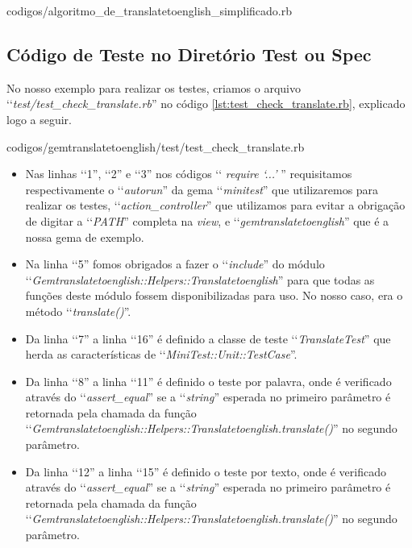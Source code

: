 
{codigos/algoritmo_de_translatetoenglish_simplificado.rb}


\subsection{Código de Teste no Diretório Test ou Spec}
\label{subsection:codigo_de_teste_no_diretorio_test_ou_spec}


No nosso exemplo para realizar os testes, criamos o arquivo ‘‘\emph{test/test\_check\_translate.rb}'' no código
\ref{lst:test_check_translate.rb}, explicado logo a seguir.


{codigos/gemtranslatetoenglish/test/test_check_translate.rb}

\begin{itemize}

 \item Nas linhas ‘‘1'', ‘‘2'' e ‘‘3'' nos códigos ‘‘ \emph{require ‘...'} '' requisitamos respectivamente o
 ‘‘\emph{autorun}'' da gema ‘‘\emph{minitest}'' que utilizaremos para realizar os testes,
 ‘‘\emph{action\_controller}'' que utilizamos para evitar a obrigação de digitar a ‘‘\emph{PATH}'' completa
 na \emph{view}, e ‘‘\emph{gemtranslatetoenglish}'' que é a nossa gema de exemplo.

 \item Na linha ‘‘5'' fomos obrigados a fazer o ‘‘\emph{include}'' do módulo
 ‘‘\emph{Gemtranslatetoenglish::Helpers::Translatetoenglish}'' para que todas as funções deste módulo fossem
 disponibilizadas para uso. No nosso caso, era o método ‘‘\emph{translate()}''.

 \item Da linha ‘‘7'' a linha ‘‘16'' é definido a classe de teste ‘‘\emph{TranslateTest}'' que herda as
 características de ‘‘\emph{MiniTest::Unit::TestCase}''.

 \item Da linha ‘‘8'' a linha ‘‘11'' é definido o teste por palavra, onde é verificado através do
 ‘‘\emph{assert\_equal}'' se a ‘‘\emph{string}'' esperada no primeiro parâmetro é retornada pela chamada
 da função ‘‘\emph{Gemtranslatetoenglish::Helpers::Translatetoenglish.translate()}'' no segundo parâmetro.

 \item Da linha ‘‘12'' a linha ‘‘15'' é definido o teste por texto, onde é verificado através do
 ‘‘\emph{assert\_equal}'' se a ‘‘\emph{string}'' esperada no primeiro parâmetro é retornada pela chamada
 da função ‘‘\emph{Gemtranslatetoenglish::Helpers::Translatetoenglish.translate()}'' no segundo parâmetro.

\end{itemize}


